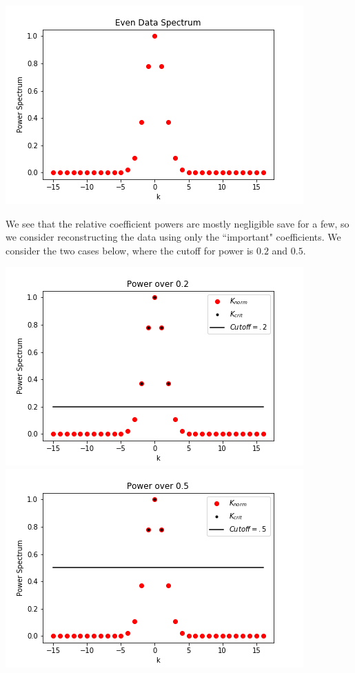 \documentclass[letterpaper,10pt]{article}
\begin{document}
\begin{enumerate}
\begin{center}
\includegraphics[scale=1]{EvenPower.png}
\end{center}
We see that the relative coefficient powers are mostly negligible save for a few, so we consider reconstructing the data using only the ``important" coefficients. We consider the two cases below, where the cutoff for power is $0.2$ and $0.5$.
\begin{center}
\includegraphics[scale=.5]{32.png}
\includegraphics[scale=.5]{35.png}

\end{center}
\end{enumerate}
\end{document}
